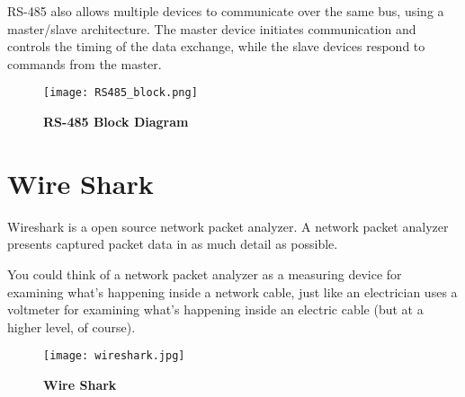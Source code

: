 \documentclass[12pt]{article}
\begin{document}
RS-485 also allows multiple devices to communicate over the same bus, using a master/slave architecture. The master device initiates communication and controls the timing of the data exchange, while the slave devices respond to commands from the master.\\

\begin{figure}[ht]
\centering
\texttt{[image: RS485\_block.png]}
\caption{\textbf{RS-485 Block Diagram}}
\label{RS485_block}
\end{figure}

\section{Wire Shark}
Wireshark is a open source network packet analyzer. A network packet analyzer presents captured packet data in as much detail as possible.

You could think of a network packet analyzer as a measuring device for examining what's happening inside a network cable, just like an electrician uses a voltmeter for examining what's happening inside an electric cable (but at a higher level, of course).

\begin{figure}[ht]
\centering
\texttt{[image: wireshark.jpg]}
\caption{\textbf{Wire Shark}}
\label{wireshark}
\end{figure}


\pagebreak
\end{document}
